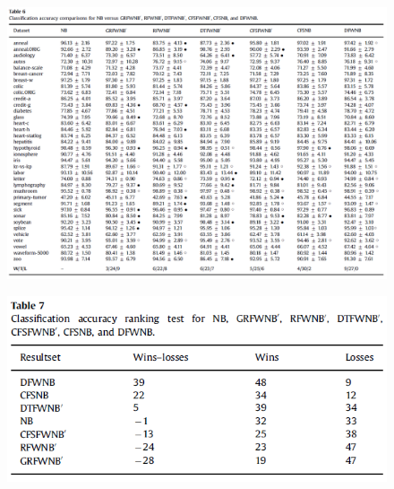 \documentclass[12pt, a4paper]{article}
\begin{document}
\begin{figure}
    \centering
    \includegraphics[width=\linewidth]{images/article1/table6.png}
    \caption{}
    \label{a1_table6}
\end{figure}
\begin{figure}
    \centering
    \includegraphics[width=\linewidth]{images/article1/table7.png}
    \caption{}
    \label{a1_table7}
\end{figure}

\clearpage
\end{document}
